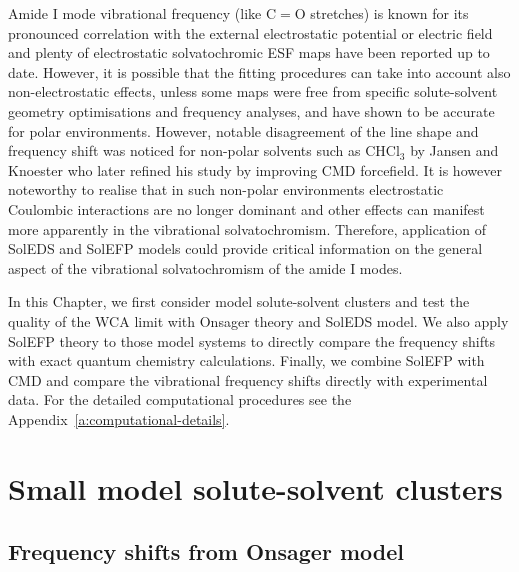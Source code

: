 \documentclass[a4paper,titlepage,twoside,fleqn,12pt]{book}
\begin{document}
\begin{refsection}
Amide I mode vibrational frequency (like C$=$O stretches) 
is known for its pronounced
correlation with the external electrostatic potential or
electric field and plenty of electrostatic solvatochromic
ESF maps have been reported up to date. \citep{Hayashi.Zhuang.Mukamel.JPCA.2005,Jansen.Knoester.JCP.2006,
Lee.Choi.Cho.JCP.2012,Torii.JCPL.2015}
However, it is possible that the fitting procedures
can take into account also non\hyp{}electrostatic effects,
unless some maps were free from specific solute\hyp{}solvent
geometry optimisations and frequency analyses,
and have shown to be accurate for polar environments. \citep{Hayashi.Zhuang.Mukamel.JPCA.2005,Jansen.Knoester.JCP.2006}
However, notable disagreement of the line shape and frequency shift was noticed for
non\hyp{}polar solvents such as CHCl$_3$ by Jansen and Knoester \citep{Jansen.Knoester.JCP.2006}
who later refined his study by improving CMD forcefield. \citep{Jansen.JPCB.2014}
It is however noteworthy to realise that in such non\hyp{}polar
environments electrostatic Coulombic interactions are no longer
dominant and other effects can manifest more apparently
in the vibrational solvatochromism. Therefore, application of
SolEDS and SolEFP models could provide critical information
on the general aspect of the vibrational solvatochromism of the amide I modes.

In this Chapter, we first consider model solute\hyp{}solvent
clusters and test the quality of the WCA limit with Onsager theory
and SolEDS model.
We also apply SolEFP theory to those model systems
to directly compare the frequency shifts with exact quantum chemistry
calculations. \citep{Blasiak.Lee.Cho.JCP.2013,Blasiak.Cho.JCP.2014,Blasiak.Cho.JCP.2015} 
Finally, we combine SolEFP with CMD and compare the vibrational
frequency shifts directly with experimental data. \citep{Blasiak.Cho.JCP.2015}
For the detailed computational procedures see the Appendix~\ref{a:computational-details}.



\section{Small model solute\hyp{}solvent clusters}

\subsection{Frequency shifts from Onsager model\label{s:amide-I-onsager}}


\end{refsection}
\end{document}

